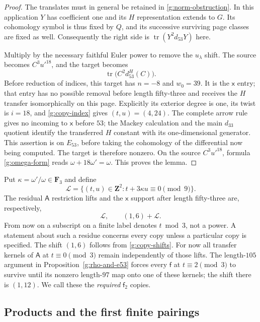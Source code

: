 \documentclass[11pt]{article}
\theoremstyle{definition}
\theoremstyle{remark}
\numberwithin{equation}{section}
\begin{document}
\begin{proof}
The translates must in general be retained in
\eqref{g:norm-obstruction}.  In this application $Y$
has coefficient one and its $H$ representation extends
to $G$.  Its cohomology symbol is thus fixed by $Q$,
and its successive surviving page classes are fixed
as well.  Consequently the right side is
$\operatorname{tr}(Y^2d_{53}Y)$ here.

Multiply by the necessary faithful Euler power to
remove the $u_\lambda$ shift.  The source becomes
$C^3u'^{18}$, and the target becomes
\[
 \operatorname{tr}\bigl(C^2d_{53}^H(C)\bigr).
\]
Before reduction of indices, this target has
$n=-8$ and $w_0=39$.  It is the $\mathsf x$ entry;
that entry has no possible removal before length
fifty-three and receives the $H$ transfer
isomorphically on this page.  Explicitly its exterior
degree is one, its twist is $i=18$, and
\eqref{g:copy-index} gives $(t,u)=(4,24)$.
The complete arrow rule gives no incoming to
$\mathsf x$ before $53$; the Mackey calculation and
the main $d_{33}$ quotient identify the transferred
$H$ constant with its one-dimensional generator.
This assertion is on $E_{53}$, before taking the
cohomology of the differential now being computed.
The target is therefore
nonzero.  On the source $C^3u'^{18}$, formula
\eqref{g:omega-form} reads
$\omega+18\omega'=\omega$.  This proves the lemma.
\end{proof}

Put $\kappa=\omega'/\omega\in\mathbf F_3$ and define
\begin{equation}\label{g:lattice}
 \mathcal L=\{(t,u)\in\mathbf Z^2:t+3\kappa u\equiv0\pmod9\}.
\end{equation}
The residual $\mathsf A$ restriction lifts and the
$\mathsf x$ support after length fifty-three are,
respectively,
\begin{equation}\label{g:A-x-support}
 \mathcal L,\qquad(1,6)+\mathcal L.
\end{equation}
From now on a subscript on a finite label denotes $t\bmod3$, not a
power.  A statement about such a residue concerns every copy unless
a particular copy is specified.
The shift $(1,6)$ follows from
\eqref{g:copy-shifts}.  For now all transfer kernels of
$\mathsf A$ at $t\equiv0\pmod3$ remain independently
of those lifts.  The length-$105$ argument in
Proposition~\ref{g:rho-and-e53} forces every
$\mathsf f$ at $t\equiv2\pmod3$ to survive until
its nonzero length-$97$ map onto one of these kernels;
the shift there is $(1,12)$.  We call these the
\emph{required} $\mathsf f_2$ copies.

\subsection{Products and the first finite pairings}
\end{document}
